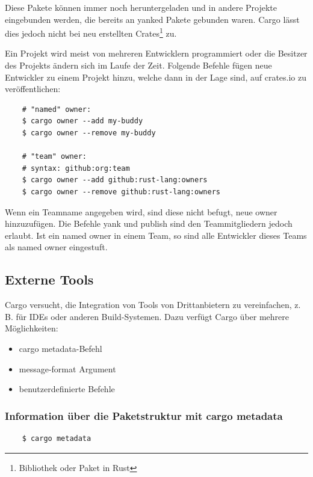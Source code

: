 Diese Pakete können immer noch heruntergeladen und in andere Projekte eingebunden werden, die bereits an \glqq yanked\grqq{} Pakete gebunden waren. Cargo lässt dies jedoch nicht bei neu erstellten Crates\footnote{Bibliothek oder Paket in Rust} zu.

Ein Projekt wird meist von mehreren Entwicklern programmiert oder die Besitzer des Projekts ändern sich im Laufe der Zeit. Folgende Befehle fügen neue Entwickler zu einem Projekt hinzu, welche dann in der Lage sind, auf crates.io zu veröffentlichen:

\begin{lstlisting}
    # "named" owner:
    $ cargo owner --add my-buddy
    $ cargo owner --remove my-buddy

    # "team" owner:
    # syntax: github:org:team
    $ cargo owner --add github:rust-lang:owners
    $ cargo owner --remove github:rust-lang:owners
\end{lstlisting}

Wenn ein Teamname angegeben wird, sind diese nicht befugt, neue \glqq owner\grqq{} hinzuzufügen. Die Befehle yank und publish sind den Teammitgliedern jedoch erlaubt. Ist ein \glqq named owner\grqq{} in einem Team, so sind alle Entwickler dieses Teams als \glqq named owner\grqq{} eingestuft.

\subsection{Externe Tools}

Cargo versucht, die Integration von Tools von Drittanbietern zu vereinfachen, z. B. für IDEs oder anderen Build-Systemen. Dazu verfügt Cargo über mehrere Möglichkeiten:

\begin{itemize}
    \item cargo metadata-Befehl
    \item message-format Argument
    \item benutzerdefinierte Befehle
\end{itemize}

\subsubsection{Information über die Paketstruktur mit cargo metadata}

\begin{lstlisting}
    $ cargo metadata
\end{lstlisting}

